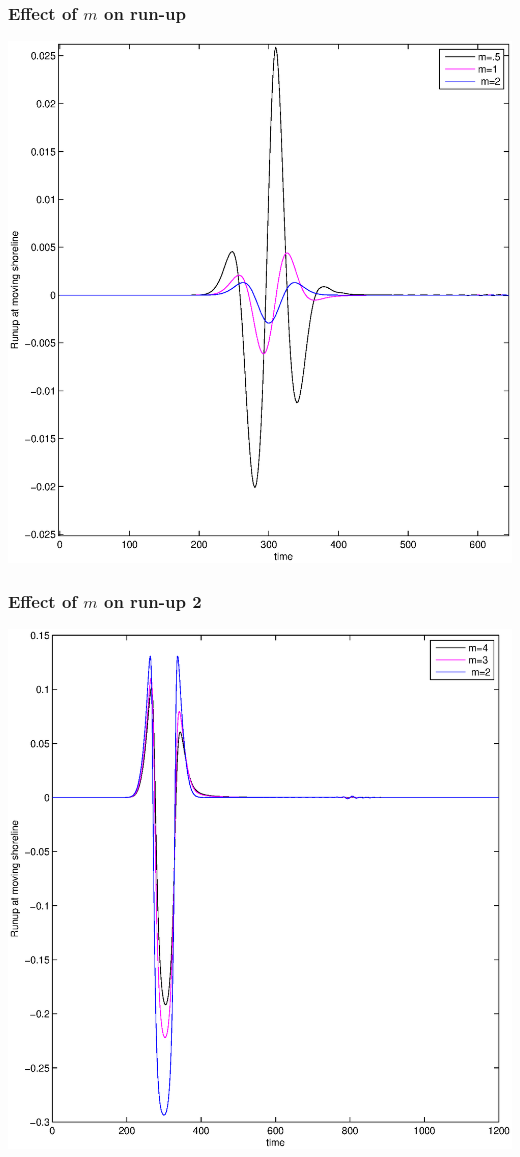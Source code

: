 	
		\begin{frame}
		\frametitle{Effect of $m$ on run-up}
		\centering
		\includegraphics[width=.7\textwidth]{Runup.eps}
		
	\end{frame}
	
			\begin{frame}
		\frametitle{Effect of $m$ on run-up 2}
		\centering
		\includegraphics[width=.7\textwidth]{Runup2.eps}
		
	\end{frame}
	
